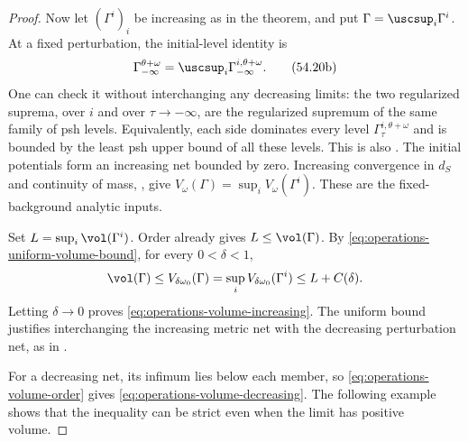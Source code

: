 \begin{proof}
Now let $(\Gamma^i)_i$ be increasing as in the theorem, and put
$\Gamma=\uscsup_i\Gamma^i$.
At a fixed perturbation, the initial-level identity is
\[
 \Gamma_{-\infty}^{\theta+\omega}
       =\uscsup_i\Gamma_{-\infty}^{i,\theta+\omega}.
\tag{54.20b}\label{eq:operations-increasing-initial-level}
\]
One can check it without interchanging any decreasing limits:
the two regularized suprema, over $i$ and over
$\tau\to-\infty$, are the regularized supremum of the same
family of psh levels.
Equivalently, each side dominates every level
$\Gamma_\tau^{i,\theta+\omega}$ and is bounded by the least
psh upper bound of all these levels.
This is also \cite[Proposition~9.4.3]{XiaBook}.
The initial potentials form an increasing net bounded by zero.
Increasing convergence in $d_S$ and continuity of mass,
\cite[Corollaries~6.2.4--6.2.5]{XiaBook}, give
$V_\omega(\Gamma)=\sup_iV_\omega(\Gamma^i)$.
These are the fixed-background analytic inputs.

Set $L=\sup_i\vol(\Gamma^i)$.
Order already gives $L\leq\vol(\Gamma)$.
By \eqref{eq:operations-uniform-volume-bound}, for every
$0<\delta<1$,
\[
 \vol(\Gamma)
 \leq V_{\delta\omega_0}(\Gamma)
 =\sup_iV_{\delta\omega_0}(\Gamma^i)
 \leq L+C(\delta).
\]
Letting $\delta\to0$ proves
\eqref{eq:operations-volume-increasing}.
The uniform bound justifies interchanging the increasing
metric net with the decreasing perturbation net, as in
\cite[Proposition~13.2.13]{XiaBook}.

For a decreasing net, its infimum lies below each member,
so \eqref{eq:operations-volume-order} gives
\eqref{eq:operations-volume-decreasing}.
The following example shows that the inequality can be strict
even when the limit has positive volume.
\end{proof}

